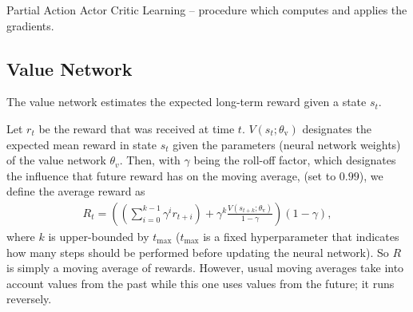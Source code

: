 \documentclass[sigconf]{acmart}
\makeatletter
\newcommand\givenbase[1][]{\:#1\lvert\:}
\let\given\givenbase
\newcommand{\StateIndent}[1][3]{%
  \setlength\@tempdima{\algorithmicindent}%
  \Statex\hskip\dimexpr#1\@tempdima\relax}
\makeatother
\begin{document}
\begin{algorithm}
\caption{Partial Action Actor Critic Learning -- procedure which computes and applies the gradients.}
\label{alg:grad}
\end{algorithm}

\subsection{Value Network}
\label{subsec:genericvalue}

The value network estimates the expected long-term reward given a state $s_t$.

Let $r_t$ be the reward that was received at time $t$. $V(s_t; \theta_\text{v})$ designates the expected mean reward in state $s_t$ given the parameters (neural network weights) of the value network $\theta_v$. Then, with $\gamma$ being the roll-off factor, which designates the influence that future reward has on the moving average, (set to $0.99$), we define the average reward as 
\begin{align*}
R_t = \left(\left(\sum_{i=0}^{k-1} \gamma^ir_{t+i}\right) + \gamma^k \frac{V(s_{t+k}; \theta_\text{v})}{1-\gamma}\right)\left(1-\gamma\right),
\end{align*}
where $k$ is upper-bounded by $t_\text{max}$ ($t_\text{max}$ is a fixed hyperparameter that indicates how many steps should be performed before updating the neural network). So $R$ is simply a moving average of rewards. However, usual moving averages take into account values from the past while this one uses values from the future; it runs reversely. 
\end{document}
